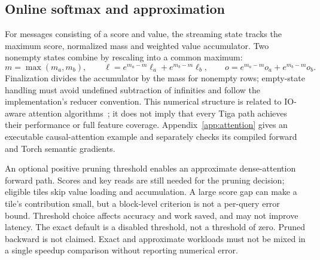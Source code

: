 \subsection{Online softmax and approximation}
For messages consisting of a score and value, the streaming state tracks the
maximum score, normalized mass and weighted value accumulator. Two nonempty
states combine by rescaling into a common maximum:
$$
 m=\max(m_a,m_b),\qquad
 \ell=e^{m_a-m}\ell_a+e^{m_b-m}\ell_b,\qquad
 o=e^{m_a-m}o_a+e^{m_b-m}o_b.
$$
Finalization divides the accumulator by the mass for nonempty rows; empty-state
handling must avoid undefined subtraction of infinities and follow the
implementation's reducer convention. This numerical structure is related to
IO-aware attention algorithms~\cite{flashattention}; it does not imply that every
Tiga path achieves their performance or full feature coverage.
Appendix~\ref{app:attention} gives an executable causal-attention example and
separately checks its compiled forward and Torch semantic gradients.

An optional positive pruning threshold enables an approximate dense-attention
forward path. Scores and key reads are still needed for the pruning decision;
eligible tiles skip value loading and accumulation. A large score gap can make
a tile's contribution small, but a block-level criterion is not a per-query
error bound. Threshold choice affects accuracy and work saved, and may not improve
latency. The exact default is a disabled threshold, not a threshold of zero.
Pruned backward is not claimed. Exact and approximate workloads must not be mixed
in a single speedup comparison without reporting numerical error.
